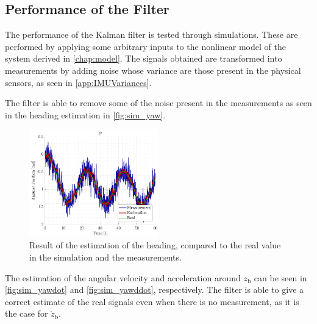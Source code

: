 \subsection{Performance of the Filter}
The performance of the Kalman filter is tested through simulations. These are performed by applying some arbitrary inputs to the nonlinear model of the system derived in \autoref{chap:model}. The signals obtained are transformed into measurements by adding noise whose variance are those present in the physical sensors, as seen in \autoref{app:IMUVariances}.


The filter is able to remove some of the noise present in the measurements as seen in the heading estimation in \autoref{fig:sim_yaw}.
\begin{figure}[H]
    \includegraphics[width=0.5\textwidth]{figures/sim_yaw}
    \caption{Result of the estimation of the heading, compared to the real value in the simulation and the measurements.}
    \label{fig:sim_yaw}
\end{figure}
%
The estimation of the angular velocity and acceleration around $z_\mathrm{b}$ can be seen in \autoref{fig:sim_yawdot} and \ref{fig:sim_yawddot}, respectively. The filter is able to give a correct estimate of the real signals even when there is no measurement, as it is the case for $\dot{z}_\mathrm{b}$.
%
